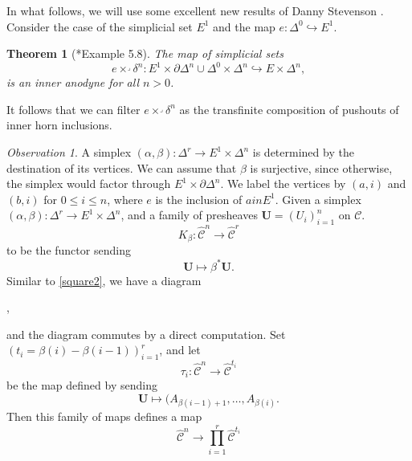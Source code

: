\documentclass{amsart}
\numberwithin{equation}{section}
\theoremstyle{plain}   %
\newtheorem{thm}[subsection]{Theorem}
\theoremstyle{remark}
\newtheorem{obs}[subsection]{Observation}
\theoremstyle{plain}
\DeclareMathOperator{\id}{id}
\newcommand{\overcat}[2]{{\left(#1\downarrow #2\right)}}
\newcommand{\psh}[1]{\ensuremath{\widehat{#1}}}
\newcommand{\C}{\ensuremath{\mathcal{C}}}
\newcommand{\ssetlab}{\ensuremath{\widehat{\Delta} \int \widehat{\mathcal{C}}}}
\begin{document}
In what follows, we will use some excellent new results of Danny Stevenson \cite{danny}.  Consider the case of the simplicial set \(E^1\) and the map \(e:\Delta^0 \hookrightarrow E^1\).  
\begin{thm}[\cite{danny}*{Example 5.8}]\label{dannythm}
	The map of simplicial sets
	\[e\times^\lrcorner \delta^n: E^1\times \partial\Delta^n \cup \Delta^0 \times \Delta^n \hookrightarrow E\times \Delta^n,\]
	is an inner anodyne for all \(n>0\).  
\end{thm}
It follows that we can filter \(e\times^\lrcorner \delta^n\) as the transfinite composition of pushouts of inner horn inclusions.
\begin{obs}\label{joyalsquare2}
	A simplex \((\alpha,\beta):\Delta^r \to E^1\times \Delta^n\) is determined by the destination of its vertices. We can assume that \(\beta\) is surjective, since otherwise, the simplex would factor through \(E^1\times \partial \Delta^n\).     We label the vertices by \((a,i)\) and \((b,i)\) for \(0\leq i \leq n\), where \(e\) is the inclusion of \(a in E^1\).  Given a simplex \((\alpha,\beta):\Delta^r\to E^1\times \Delta^n\), and a family of presheaves \(\mathbf{U}=(U_i)_{i=1}^n\) on \(\C\). 
	\[K_{\beta}:\psh{\C}^n \to \psh{\C}^r\]
	to be the functor sending
	\[\mathbf{U} \mapsto \beta^\ast \mathbf{U}.\]
	Similar to \ref{square2}, we have a diagram
	\begin{center}
		,
	\end{center}
	and the diagram commutes by a direct computation.  
	Set \((t_i=\beta(i) - \beta(i-1))_{i=1}^r\), and let 
	\[\tau_i:\psh{\C}^n \to \psh{\C}^{t_i}\]
	be the map defined by sending 
	\[\mathbf{U}\mapsto (A_{\beta(i-1)+1},\dots,A_{\beta(i)}.\]
	Then this family of maps defines a map 
	\[\psh{\C}^n \to \prod_{i=1}^r\psh{\C}^{t_i}\]

\end{obs}
\end{document}
